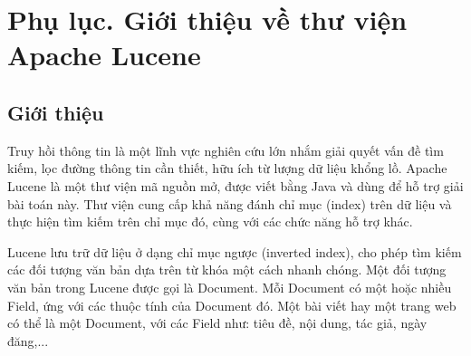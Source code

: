 
\chapter*{Phụ lục. Giới thiệu về thư viện Apache Lucene}

\section*{Giới thiệu}
Truy hồi thông tin là một lĩnh vực nghiên cứu lớn nhắm giải quyết vấn đề tìm kiếm, lọc đường thông tin cần thiết, hữu ích từ lượng dữ liệu khổng lồ. Apache Lucene là một thư viện mã nguồn mở, được viết bằng Java và dùng để hỗ trợ giải bài toán này. Thư viện cung cấp khả năng đánh chỉ mục (index) trên dữ liệu và thực hiện tìm kiếm trên chỉ mục đó, cùng với các chức năng hỗ trợ khác.

Lucene lưu trữ dữ liệu ở dạng chỉ mục ngược (inverted index), cho phép tìm kiếm các đối tượng văn bản dựa trên từ khóa một cách nhanh chóng. Một đối tượng văn bản trong Lucene được gọi là Document. Mỗi Document có một hoặc nhiều Field, ứng với các thuộc tính của Document đó. Một bài viết hay một trang web có thể là một Document, với các Field như: tiêu đề, nội dung, tác giả, ngày đăng,...

